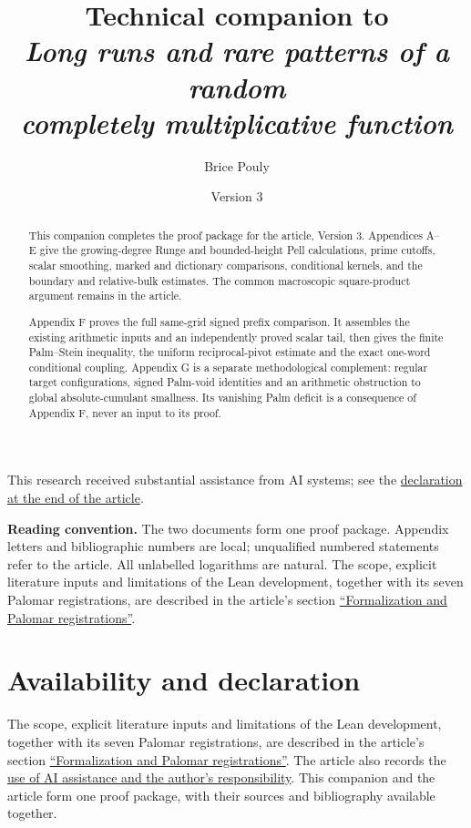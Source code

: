 \documentclass[11pt,a4paper]{article}
\title{\textbf{Technical companion to}\\[2mm]
\large\emph{Long runs and rare patterns of a random\\completely multiplicative function}}
\author{Brice Pouly}
\date{Version 3}
\begin{document}
\maketitle
\vspace{-0.6em}
\noindent\begin{minipage}{\textwidth}\footnotesize
This research received substantial assistance from AI systems; see the
\hyperref[sec:ai-assistance]{declaration at the end of the article}.
\end{minipage}\medskip
\begin{abstract}
This companion completes the proof package for the article, Version 3.
Appendices A--E give the growing-degree Runge and bounded-height Pell
calculations, prime cutoffs, scalar smoothing, marked and dictionary
comparisons, conditional kernels, and the boundary and relative-bulk
estimates. The common macroscopic square-product argument remains in
the article.

Appendix F proves the full same-grid signed prefix comparison. It
assembles the existing arithmetic inputs and an independently proved
scalar tail, then gives the finite Palm--Stein inequality, the uniform
reciprocal-pivot estimate and the exact one-word conditional coupling.
Appendix G is a separate methodological complement: regular target
configurations, signed Palm-void identities and an arithmetic obstruction
to global absolute-cumulant smallness. Its vanishing Palm deficit is a
consequence of Appendix F, never an input to its proof.
\end{abstract}
\medskip
\noindent\textbf{Reading convention.} The two documents form one proof package.
Appendix letters and bibliographic numbers are local; unqualified
numbered statements refer to the article. All unlabelled logarithms are
natural. The scope, explicit literature inputs and limitations of the Lean
development, together with its seven Palomar registrations, are described in the
article's section
\hyperref[sec:formalization]{``Formalization and Palomar registrations''}.

\tableofcontents
\clearpage


\medskip
\appendix







\section*{Availability and declaration}
The scope, explicit literature inputs and limitations of the Lean development,
together with its seven Palomar registrations, are described in the article's
section \hyperref[sec:formalization]{``Formalization and Palomar registrations''}.
The article also records the \hyperref[sec:ai-assistance]{use of AI assistance and
the author's responsibility}. This companion and the article form one proof
package, with their sources and bibliography available together.
\printbibliography[heading=bibintoc,title={References}]
\end{document}
